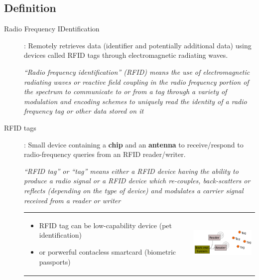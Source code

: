 \subsection{Definition}

\begin{description}
    \item[Radio Frequency IDentification]: Remotely retrieves data
        (identifier and potentially additional data) using devices
        called RFID tags through electromagnetic radiating waves.

        \begin{center}
            \textit{“Radio frequency identification” (RFID) means the use of
                electromagnetic radiating waves or reactive field coupling in the
                radio frequency portion of the spectrum to communicate to or
                from a tag through a variety of modulation and encoding schemes
                to uniquely read the identity of a radio frequency tag or other data
            stored on it}
        \end{center}

    \item[RFID tags]: Small device containing a \textbf{chip} and an
        \textbf{antenna} to receive/respond to radio-frequency queries
        from an RFID reader/writer.

        \begin{center}
            \textit{“RFID tag” or “tag” means either a RFID device having the ability
                to produce a radio signal or a RFID device which re-couples,
                back-scatters or reflects (depending on the type of device) and
            modulates a carrier signal received from a reader or writer}
        \end{center}

        \begin{tabular}{m{10cm}m{4cm}}
            \begin{itemize}
                \item RFID tag can be low-capability device (pet
                    identification)
                \item or porwerful contacless smartcard (biometric
                    passports)
            \end{itemize}
            &
            \includegraphics[width=4cm]{img/archRFID}
        \end{tabular}
\end{description}


